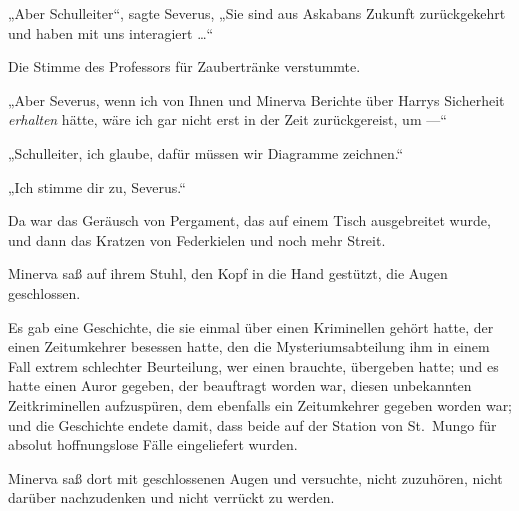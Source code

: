 „Aber Schulleiter“, sagte Severus,
„Sie sind aus Askabans Zukunft zurückgekehrt und haben mit uns interagiert …“

Die Stimme des Professors für Zaubertränke verstummte.

„Aber Severus, wenn ich von Ihnen und Minerva Berichte über Harrys Sicherheit \emph{erhalten} hätte, wäre ich gar nicht erst in der Zeit zurückgereist, um —“

„Schulleiter, ich glaube, dafür müssen wir Diagramme zeichnen.“

„Ich stimme dir zu, Severus.“

Da war das Geräusch von Pergament, das auf einem Tisch ausgebreitet wurde, und dann das Kratzen von Federkielen und noch mehr Streit.

Minerva saß auf ihrem Stuhl, den Kopf in die Hand gestützt, die Augen geschlossen.

Es gab eine Geschichte, die sie einmal über einen Kriminellen gehört hatte, der einen Zeitumkehrer besessen hatte, den die Mysteriumsabteilung ihm in einem Fall extrem schlechter Beurteilung, wer einen brauchte, übergeben hatte; und es hatte einen Auror gegeben, der beauftragt worden war, diesen unbekannten Zeitkriminellen aufzuspüren, dem ebenfalls ein Zeitumkehrer gegeben worden war; und die Geschichte endete damit, dass beide auf der Station von St.~Mungo für absolut hoffnungslose Fälle eingeliefert wurden.

Minerva saß dort mit geschlossenen Augen und versuchte, nicht zuzuhören, nicht darüber nachzudenken und nicht verrückt zu werden.

